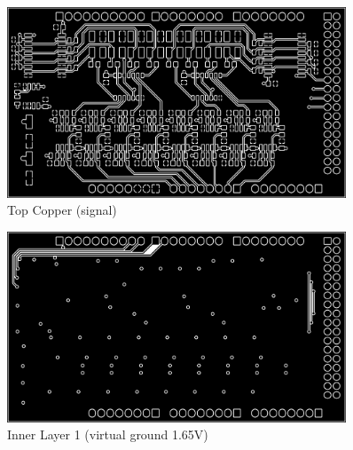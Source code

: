 \begin{figure}[htb]
\begin{center}
\includegraphics[width=0.9\textwidth]{graphics/image_appendix_copper_top.png}
\end{center}
\caption{Top Copper (signal)} %
\label{fig:image_appendix_copper_top}
\end{figure}
%

\begin{figure}[htb]
\begin{center}
\includegraphics[width=0.9\textwidth]{graphics/image_appendix_copper_1.png}
\end{center}
\caption{Inner Layer 1 (virtual ground 1.65V)} %
\label{fig:image_appendix_copper_1}
\end{figure}
%

